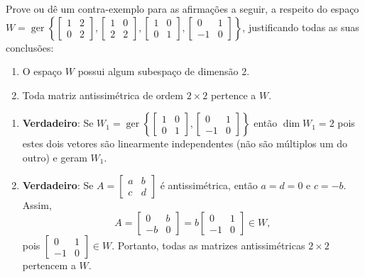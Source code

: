 \documentclass[12pt,a4paper]{article}
\newcommand*\ger[1]{\operatorname{ger}\left\{#1\right\}}
\begin{document}
\begin{ExerciseList}
\Exercise[title={2,5}] Prove ou dê um contra-exemplo para as afirmações a seguir, a respeito do espaço $W = \ger{
\begin{bmatrix}
1 & 2 \\ 0 & 2
\end{bmatrix},
\begin{bmatrix}
1 & 0 \\ 2 & 2
\end{bmatrix},
\begin{bmatrix}
1 & 0 \\ 0 & 1
\end{bmatrix},
\begin{bmatrix}
0 & 1 \\ -1 & 0
\end{bmatrix}
}$, justificando todas as suas conclusões:
\begin{enumerate}
\item O espaço $W$ possui algum subespaço de dimensão 2.
\item Toda matriz antissimétrica de ordem $2 \times 2$ pertence a $W$.
\end{enumerate}
\Answer
\begin{enumerate}
\item \textbf{Verdadeiro}: Se $W_1 = \ger{
\begin{bmatrix}
1 & 0 \\ 0 & 1
\end{bmatrix},
\begin{bmatrix}
0 & 1 \\ -1 & 0
\end{bmatrix}
}$ então $\dim W_1 = 2$ pois estes dois vetores são linearmente independentes (não são múltiplos um do outro) e geram $W_1$.
\item \textbf{Verdadeiro}: Se $A =
\begin{bmatrix}
a & b \\ c & d
\end{bmatrix}
$ é antissimétrica, então $a=d=0$ e $c=-b$. Assim,
\[
A =
\begin{bmatrix}
0 & b \\ -b & 0
\end{bmatrix}
=b \begin{bmatrix}
0 & 1 \\ -1 & 0
\end{bmatrix}
\in W,
\]
pois $\begin{bmatrix}
0 & 1 \\ -1 & 0
\end{bmatrix}
\in W$. Portanto, todas as matrizes antissimétricas $2\times 2$ pertencem a $W$.
\end{enumerate}


\end{ExerciseList}
\end{document}

